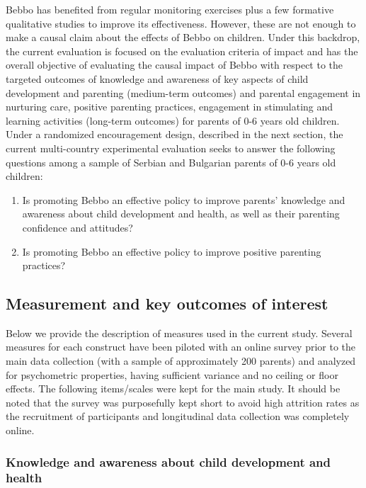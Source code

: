 Bebbo has benefited from regular monitoring exercises plus a few formative qualitative studies to improve its effectiveness. However, these are not enough to make a causal claim about the effects of Bebbo on children. Under this backdrop, the current evaluation is focused on the evaluation criteria of impact and has the overall objective of evaluating the causal impact of Bebbo with respect to the targeted outcomes of knowledge and awareness of key aspects of child development and parenting (medium-term outcomes) and parental engagement in nurturing care, positive parenting practices, engagement in stimulating and learning activities (long-term outcomes) for parents of 0-6 years old children.
Under a randomized encouragement design, described in the next section, the current multi-country experimental evaluation seeks to answer the following questions among a sample of Serbian and Bulgarian parents of 0-6 years old children:

\begin{enumerate}
\item Is promoting Bebbo an effective policy to improve parents’ knowledge and awareness about child development and health, as well as their parenting confidence and attitudes?
\item Is promoting Bebbo an effective policy to  improve positive parenting practices?
\end{enumerate}


\subsection{Measurement and key outcomes of interest}

Below we provide the description of measures used in the current study. Several measures for each construct have been piloted with an online survey prior to the main data collection (with a sample of approximately 200 parents) and analyzed for psychometric properties, having sufficient variance and no ceiling or floor effects. The following items/scales were kept for the main study. It should be noted that the survey was purposefully kept short to avoid high attrition rates as the recruitment of participants and longitudinal data collection was completely online.

\subsubsection*{Knowledge and awareness about child development and health}

